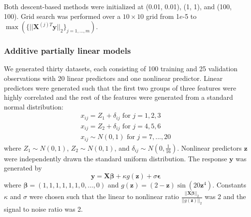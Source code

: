 \documentclass{statsoc}
\begin{document}
Both descent-based methods were initialized at (0.01, 0.01), (1, 1), and (100, 100). Grid search was performed over a $10 \times 10$ grid from 1$e$-5 to $\max(\{||\boldsymbol X^{(j)T} \boldsymbol y ||_2\}_{j=1,..., m})$.

\subsubsection{Additive partially linear models}\label{sec:simulation_aplm}
We generated thirty datasets, each consisting of 100 training and 25 validation observations with 20 linear predictors and one nonlinear predictor. Linear predictors were generated such that the first two groups of three features were highly correlated and the rest of the features were generated from a standard normal distribution:
\begin{equation}
\begin{array}{c}
x_{ij} = Z_1 + \delta_{ij} \text{ for } j=1, 2, 3 \\
x_{ij} = Z_2 + \delta_{ij} \text{ for } j= 4, 5, 6 \\
x_{ij} \sim N(0,1) \text{ for } j = 7, ..., 20
\end{array}
\end{equation}
where $Z_1 \sim N(0,1)$, $Z_2 \sim N(0,1)$, and $\delta_{ij} \sim N(0, \frac{1}{16})$. Nonlinear predictors $\boldsymbol z$ were independently drawn the standard uniform distribution. The response $\boldsymbol y$ was generated by
\begin{equation}
\boldsymbol y = \boldsymbol X \boldsymbol \beta + \kappa g(\boldsymbol z) + \sigma \boldsymbol \epsilon
\end{equation}
where $\boldsymbol \beta = (1, 1, 1, 1, 1, 1, 0, ..., 0)$ and $g(\boldsymbol z) =(2-\boldsymbol z)\sin(20 \boldsymbol z^4)$. Constants $\kappa$ and $\sigma$ were chosen such that the linear to nonlinear ratio $\frac{||\boldsymbol X \boldsymbol \beta||_2}{||g(\boldsymbol z)||_2}$ was 2 and the signal to noise ratio was 2. 
\end{document}
